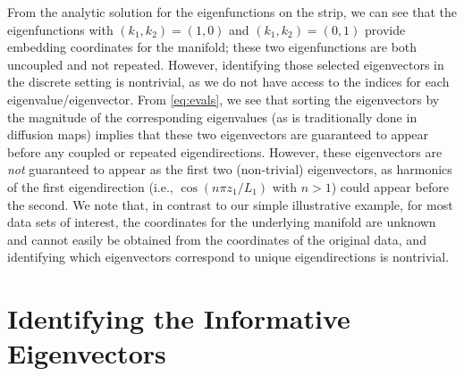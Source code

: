 From the analytic solution for the eigenfunctions on the strip, we can see that the eigenfunctions with $(k_1, k_2) =(1, 0)$ and $(k_1, k_2) =(0, 1)$ provide embedding coordinates for the manifold; these two eigenfunctions are both uncoupled and not repeated.
%
However, identifying those selected eigenvectors in the discrete setting is nontrivial, as we do not have access to the indices for each eigenvalue/eigenvector.
%
From \eqref{eq:evals}, we see that sorting the eigenvectors by the magnitude of the corresponding eigenvalues (as is traditionally done in diffusion maps) implies that these two eigenvectors are guaranteed to appear before any coupled or repeated eigendirections.
%
However, these eigenvectors are {\em not} guaranteed to appear as the first two (non-trivial) eigenvectors, as harmonics of the first eigendirection (i.e., $\cos \left( n \pi z_1 / L_1 \right)$ with $n > 1$) could appear before the second.
%
We note that, in contrast to our simple illustrative example, for most data sets of interest, the coordinates for the underlying manifold are unknown and cannot easily be obtained from the coordinates of the original data, and identifying which eigenvectors correspond to unique eigendirections is nontrivial.

\section{Identifying the Informative Eigenvectors }

